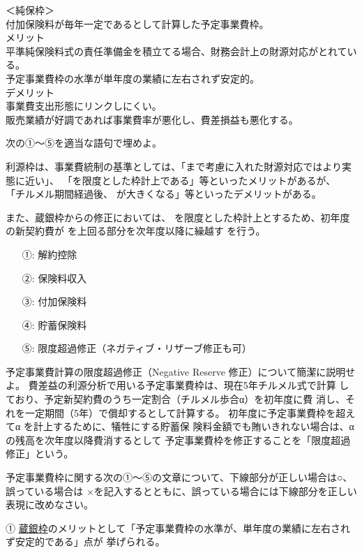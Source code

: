 \documentclass[report,gutter=10mm,fore-edge=10mm,uplatex,dvipdfmx]{jlreq}
\begin{document}
\noindent＜純保枠＞\\
付加保険料が毎年一定であるとして計算した予定事業費枠。\\
メリット \\
平準純保険料式の責任準備金を積立てる場合、財務会計上の財源対応がとれている。\\
予定事業費枠の水準が単年度の業績に左右されず安定的。\\
デメリット\\
事業費支出形態にリンクしにくい。\\
販売業績が好調であれば事業費率が悪化し、費差損益も悪化する。

次の①～⑤を適当な語句で埋めよ。

利源枠は、事業費統制の基準としては、「まで考慮に入れた財源対応ではより実態に近い」、
「を限度とした枠計上である」等といったメリットがあるが、
「チルメル期間経過後、 が大きくなる」等といったデメリットがある。

また、蔵銀枠からの修正においては、
を限度とした枠計上とするため、初年度の新契約費が
を上回る部分を次年度以降に繰越す
を行う。

\answer{}
\begin{itemize}
\item[ ①: ] 解約控除
\item[ ②: ] 保険料収入
\item[ ③: ] 付加保険料
\item[ ④: ] 貯蓄保険料
\item[ ⑤: ] 限度超過修正（ネガティブ・リザーブ修正も可）
\end{itemize}


予定事業費計算の限度超過修正（Negative Reserve 修正）について簡潔に説明せよ。
\answer{}
費差益の利源分析で用いる予定事業費枠は、現在5年チルメル式で計算
しており、予定新契約費のうち一定割合（チルメル歩合α）を初年度に費
消し、それを一定期間（5年）で償却するとして計算する。
初年度に予定事業費枠を超えてα
を計上するために、犠牲にする貯蓄保
険料金額でも賄いきれない場合は、α
の残高を次年度以降費消するとして
予定事業費枠を修正することを「限度超過修正」という。

予定事業費枠に関する次の①～⑤の文章について、下線部分が正しい場合は○、誤っている場合は
×を記入するとともに、誤っている場合には下線部分を正しい表現に改めなさい。

① \underline{蔵銀枠}のメリットとして「予定事業費枠の水準が、単年度の業績に左右されず安定的である」点が
挙げられる。
\end{document}
